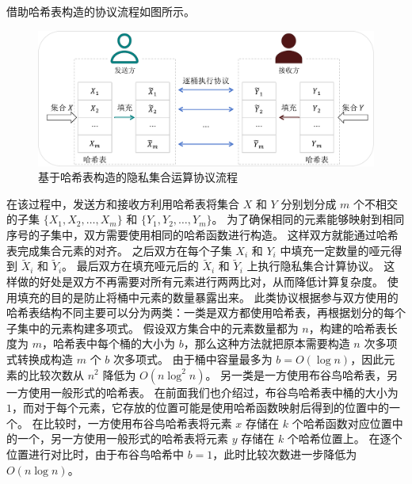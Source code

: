 借助哈希表构造的协议流程如图所示。
\begin{figure}[ht]
  \centering
  \includegraphics[width=\textwidth]{figures/pso_ht.pdf}
  \caption{基于哈希表构造的隐私集合运算协议流程}
  \label{fig:pso_ht}
\end{figure}
在该过程中，发送方和接收方利用哈希表将集合 $X$ 和 $Y$ 分别划分成 $m$ 个不相交的子集 $\{X_1, X_2, \dots, X_m\}$ 和 $\{Y_1, Y_2, \dots, Y_m\}$。
为了确保相同的元素能够映射到相同序号的子集中，双方需要使用相同的哈希函数进行构造。
这样双方就能通过哈希表完成集合元素的对齐。
之后双方在每个子集 $X_i$ 和 $Y_i$ 中填充一定数量的哑元得到 $\tilde{X}_i$ 和 $\tilde{Y}_i$。
最后双方在填充哑元后的 $\tilde{X}_i$ 和 $\tilde{Y}_i$ 上执行隐私集合计算协议。
这样做的好处是双方不再需要对所有元素进行两两比对，从而降低计算复杂度。
使用填充的目的是防止将桶中元素的数量暴露出来。
此类协议根据参与双方使用的哈希表结构不同主要可以分为两类：一类是双方都使用哈希表，再根据划分的每个子集中的元素构建多项式。
假设双方集合中的元素数量都为 $n$，构建的哈希表长度为 $m$，哈希表中每个桶的大小为 $b$，那么这种方法就把原本需要构造 $n$ 次多项式转换成构造 $m$ 个 $b$ 次多项式。
由于桶中容量最多为 $b=O(\log n)$，因此元素的比较次数从 $n^2$ 降低为 $O(n\log^2n)$。
另一类是一方使用布谷鸟哈希表，另一方使用一般形式的哈希表。
在前面我们也介绍过，布谷鸟哈希表中桶的大小为 $1$，而对于每个元素，它存放的位置可能是使用哈希函数映射后得到的位置中的一个。
在比较时，一方使用布谷鸟哈希表将元素 $x$ 存储在 $k$ 个哈希函数对应位置中的一个，另一方使用一般形式的哈希表将元素 $y$ 存储在 $k$ 个哈希位置上。
在逐个位置进行对比时，由于布谷鸟哈希中 $b=1$，此时比较次数进一步降低为 $O(n\log n)$。

